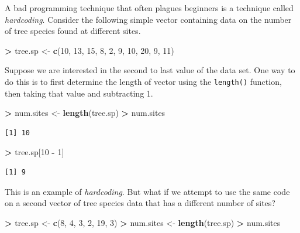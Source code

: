 \documentclass[]{krantz}
\makeatletter
\newenvironment{Shaded}{\begin{snugshade}}{\end{snugshade}}
\newcommand{\KeywordTok}[1]{\textcolor[rgb]{0.27,0.27,0.27}{\textbf{#1}}}
\newcommand{\DecValTok}[1]{\textcolor[rgb]{0.06,0.06,0.06}{#1}}
\newcommand{\StringTok}[1]{\textcolor[rgb]{0.5,0.5,0.5}{#1}}
\newcommand{\OperatorTok}[1]{\textcolor[rgb]{0.43,0.43,0.43}{\textbf{#1}}}
\newcommand{\NormalTok}[1]{#1}
\newenvironment{kframe}{%
\medskip{}
\setlength{\fboxsep}{.8em}
 \def\at@end@of@kframe{}%
 \ifinner\ifhmode%
  \def\at@end@of@kframe{\end{minipage}}%
  \begin{minipage}{\columnwidth}%
 \fi\fi%
 \def\FrameCommand##1{\hskip\@totalleftmargin \hskip-\fboxsep
 \colorbox{shadecolor}{##1}\hskip-\fboxsep
     \hskip-\linewidth \hskip-\@totalleftmargin \hskip\columnwidth}%
 \MakeFramed {\advance\hsize-\width
   \@totalleftmargin\z@ \linewidth\hsize
   \@setminipage}}%
 {\par\unskip\endMakeFramed%
 \at@end@of@kframe}
\renewenvironment{Shaded}{\begin{kframe}}{\end{kframe}}
\makeatother
\begin{document}
A bad programming technique that often plagues beginners is a technique
called \emph{hardcoding}. Consider the following simple vector
containing data on the number of tree species found at different sites.

\begin{Shaded}
\begin{Highlighting}[]
\OperatorTok{>}\StringTok{ }\NormalTok{tree.sp <-}\StringTok{ }\KeywordTok{c}\NormalTok{(}\DecValTok{10}\NormalTok{, }\DecValTok{13}\NormalTok{, }\DecValTok{15}\NormalTok{, }\DecValTok{8}\NormalTok{, }\DecValTok{2}\NormalTok{, }\DecValTok{9}\NormalTok{, }\DecValTok{10}\NormalTok{, }\DecValTok{20}\NormalTok{, }\DecValTok{9}\NormalTok{, }\DecValTok{11}\NormalTok{)}
\end{Highlighting}
\end{Shaded}

Suppose we are interested in the second to last value of the data set.
One way to do this is to first determine the length of vector using the
\texttt{length()} function, then taking that value and subtracting 1.

\begin{Shaded}
\begin{Highlighting}[]
\OperatorTok{>}\StringTok{ }\NormalTok{num.sites <-}\StringTok{ }\KeywordTok{length}\NormalTok{(tree.sp)}
\OperatorTok{>}\StringTok{ }\NormalTok{num.sites}
\end{Highlighting}
\end{Shaded}

\begin{verbatim}
[1] 10
\end{verbatim}

\begin{Shaded}
\begin{Highlighting}[]
\OperatorTok{>}\StringTok{ }\NormalTok{tree.sp[}\DecValTok{10} \OperatorTok{-}\StringTok{ }\DecValTok{1}\NormalTok{]}
\end{Highlighting}
\end{Shaded}

\begin{verbatim}
[1] 9
\end{verbatim}

This is an example of \emph{hardcoding}. But what if we attempt to use
the same code on a second vector of tree species data that has a
different number of sites?

\begin{Shaded}
\begin{Highlighting}[]
\OperatorTok{>}\StringTok{ }\NormalTok{tree.sp <-}\StringTok{ }\KeywordTok{c}\NormalTok{(}\DecValTok{8}\NormalTok{, }\DecValTok{4}\NormalTok{, }\DecValTok{3}\NormalTok{, }\DecValTok{2}\NormalTok{, }\DecValTok{19}\NormalTok{, }\DecValTok{3}\NormalTok{)}
\OperatorTok{>}\StringTok{ }\NormalTok{num.sites <-}\StringTok{ }\KeywordTok{length}\NormalTok{(tree.sp)}
\OperatorTok{>}\StringTok{ }\NormalTok{num.sites}
\end{Highlighting}
\end{Shaded}
\end{document}
